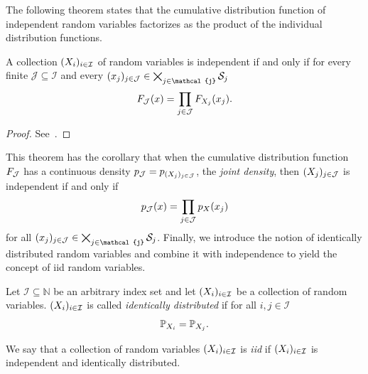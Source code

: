 The following theorem states that the cumulative distribution function of independent random variables factorizes as the product of the individual distribution functions.
\begin{theorem}
	A collection \( (X_i)_{i\in\mathcal{I}} \) of random variables is independent if and only if for every finite \( \mathcal{J} \subseteq \mathcal{I} \) and every \( (x_j)_{j\in\mathcal{J}} \in \bigtimes_{j\in\mathcal{j}} \ASet_j \) 
	\begin{equation}
		F_{\mathcal{J}} (x) = \prod_{j\in\mathcal{J}} F_{X_j} (x_j).
	\end{equation}
\end{theorem}
\begin{proof}
	See~\cite[Section 2.2, Theorem 2.21]{Klenke2014}.
\end{proof}
This theorem has the corollary that when the cumulative distribution function \( F_{\mathcal{J}} \) has a continuous density \( p_{\mathcal{J}} = p_{(X_j)_{j\in\mathcal{J}}} \), the \emph{joint density}, then \( (X_j)_{j\in\mathcal{J}} \) is independent if and only if
\begin{equation}
	p_{\mathcal{J}}(x) = \prod_{j\in\mathcal{J}} p_{X}(x_j)
\end{equation}
for all \( (x_j)_{j\in\mathcal{J}} \in \bigtimes_{j\in\mathcal{j}} \ASet_j \).
Finally, we introduce the notion of identically distributed random variables and combine it with independence to yield the concept of \gls{iid} random variables.
\begin{definition}%
	\label{def:identically distributed}
	Let \( \mathcal{I} \subseteq \mathbb{N} \) be an arbitrary index set and let \( (X_i)_{i\in\mathcal{I}} \) be a collection of random variables.
	\( (X_i)_{i\in\mathcal{I}} \) is called \emph{identically distributed} if for all \( i, j \in \mathcal{I} \)
	\begin{equation}
		\mathbb{P}_{X_i} = \mathbb{P}_{X_j}.
	\end{equation}
\end{definition}
We say that a collection of random variables \( (X_i)_{i\in\mathcal{I}} \) is \emph{\gls{iid}} if \( (X_i)_{i\in\mathcal{I}} \) is independent and identically distributed.
